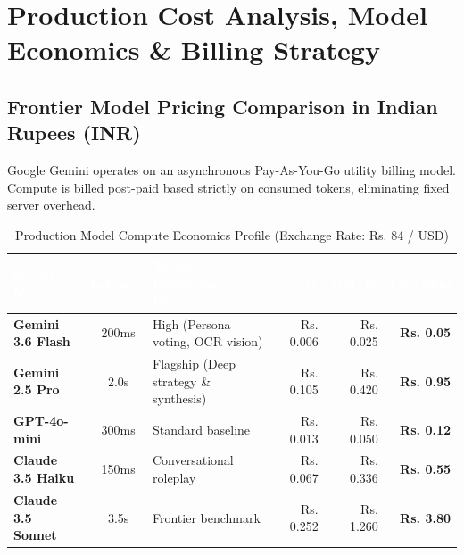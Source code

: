 \documentclass[11pt,a4paper]{article}
\begin{document}
\newpage
\section{Production Cost Analysis, Model Economics \& Billing Strategy}

\subsection{Frontier Model Pricing Comparison in Indian Rupees (INR)}
Google Gemini operates on an asynchronous Pay-As-You-Go utility billing model. Compute is billed post-paid based strictly on consumed tokens, eliminating fixed server overhead.

\begin{table}[htbp]
\centering
\small
\setlength{\aboverulesep}{0pt}
\setlength{\belowrulesep}{0pt}
\setlength{\tabcolsep}{3pt}
\renewcommand{\arraystretch}{1.25}
\begin{tabularx}{\textwidth}{l c X r r r}
\toprule
\rowcolor{tblheaderblue}
\textcolor{white}{\textbf{Model Name}} & 
\textcolor{white}{\textbf{Latency}} & 
\textcolor{white}{\textbf{Target Intelligence Profile}} & 
\textcolor{white}{\textbf{In/1k}} & 
\textcolor{white}{\textbf{Out/1k}} & 
\textcolor{white}{\textbf{Cost/Sim}} \\
\midrule
\textbf{Gemini 3.6 Flash} & ~200ms & High (Persona voting, OCR vision) & Rs. 0.006 & Rs. 0.025 & \textbf{Rs. 0.05} \\
\textbf{Gemini 2.5 Pro} & ~2.0s & Flagship (Deep strategy \& synthesis) & Rs. 0.105 & Rs. 0.420 & \textbf{Rs. 0.95} \\
\textbf{GPT-4o-mini} & ~300ms & Standard baseline & Rs. 0.013 & Rs. 0.050 & \textbf{Rs. 0.12} \\
\textbf{Claude 3.5 Haiku} & ~150ms & Conversational roleplay & Rs. 0.067 & Rs. 0.336 & \textbf{Rs. 0.55} \\
\textbf{Claude 3.5 Sonnet} & ~3.5s & Frontier benchmark & Rs. 0.252 & Rs. 1.260 & \textbf{Rs. 3.80} \\
\bottomrule
\end{tabularx}
\caption{Production Model Compute Economics Profile (Exchange Rate: Rs. 84 / USD)}
\label{tab:model_economics}
\end{table}
\end{document}
